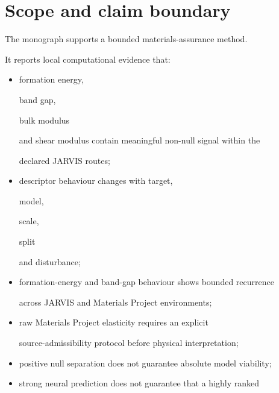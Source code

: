 \documentclass[11pt,a4paper,oneside]{report}
\begin{document}
\section{Scope and claim boundary}



The monograph supports a bounded materials-assurance method.



It reports local computational evidence that:



\begin{itemize}



\item

formation energy,

band gap,

bulk modulus

and shear modulus contain meaningful non-null signal within the

declared JARVIS routes;



\item

descriptor behaviour changes with target,

model,

scale,

split

and disturbance;



\item

formation-energy and band-gap behaviour shows bounded recurrence

across JARVIS and Materials Project environments;



\item

raw Materials Project elasticity requires an explicit

source-admissibility protocol before physical interpretation;



\item

positive null separation does not guarantee absolute model viability;



\item

strong neural prediction does not guarantee that a highly ranked


\end{itemize}
\end{document}
